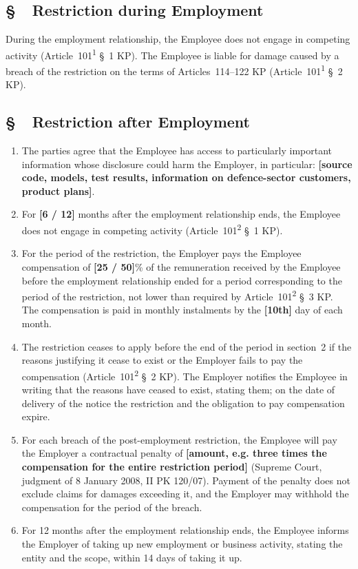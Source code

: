 \documentclass[11pt,a4paper]{report}
\newcounter{paragraf}
\newcommand{\paragraf}[1]{%
  \refstepcounter{paragraf}%
  \Needspace{5\baselineskip}%
  \subsection*{\S~\theparagraf\ #1}%
}
\newenvironment{ContractClause}[1]{\paragraf{#1}}{\par}
\newcommand{\field}[1]{\textbf{[#1]}}
\begin{document}
\begin{ContractClause}{Restriction during Employment}
During the employment relationship, the Employee does not engage in competing activity (Article~101\textsuperscript{1} \S~1 KP). The Employee is liable for damage caused by a breach of the restriction on the terms of Articles~114--122 KP (Article~101\textsuperscript{1} \S~2 KP).
\end{ContractClause}

\begin{ContractClause}{Restriction after Employment}
\label{c:po}
\begin{enumerate}
  \item The parties agree that the Employee has access to particularly important information whose disclosure could harm the Employer, in particular: \field{source code, models, test results, information on defence-sector customers, product plans}.
  \item For \field{6 / 12} months after the employment relationship ends, the Employee does not engage in competing activity (Article~101\textsuperscript{2} \S~1 KP).
  \item For the period of the restriction, the Employer pays the Employee compensation of \field{25 / 50}\% of the remuneration received by the Employee before the employment relationship ended for a period corresponding to the period of the restriction, not lower than required by Article~101\textsuperscript{2} \S~3 KP. The compensation is paid in monthly instalments by the \field{10th} day of each month.
  \item The restriction ceases to apply before the end of the period in section~2 if the reasons justifying it cease to exist or the Employer fails to pay the compensation (Article~101\textsuperscript{2} \S~2 KP). The Employer notifies the Employee in writing that the reasons have ceased to exist, stating them; on the date of delivery of the notice the restriction and the obligation to pay compensation expire.
  \item For each breach of the post-employment restriction, the Employee will pay the Employer a contractual penalty of \field{amount, e.g. three times the compensation for the entire restriction period} (Supreme Court, judgment of 8 January 2008, II PK 120/07). Payment of the penalty does not exclude claims for damages exceeding it, and the Employer may withhold the compensation for the period of the breach.
  \item For 12 months after the employment relationship ends, the Employee informs the Employer of taking up new employment or business activity, stating the entity and the scope, within 14 days of taking it up.
\end{enumerate}
\end{ContractClause}
\end{document}

